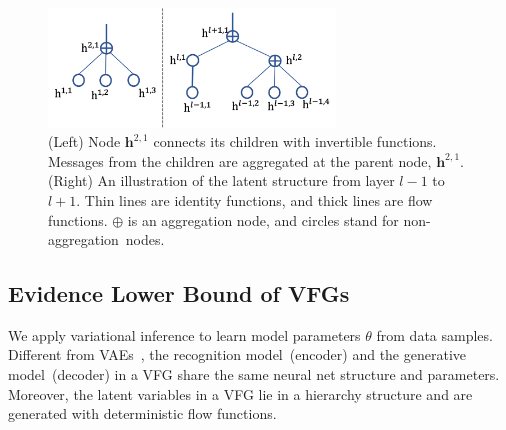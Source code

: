 \documentclass[sigconf, anonymous, review]{acmart}
\theoremstyle{plain}
\theoremstyle{definition}
\theoremstyle{remark}
\begin{document}
\begin{figure}[h]
\vspace{-0.2in}
\begin{center}
 \includegraphics[width=3in]{fig/tree_node.png}
\end{center}
\vspace{-0.15in}
\caption{\small  (Left)  Node $\mathbf{h}^{2, 1}$ connects its children with invertible functions. Messages from the children are aggregated at the parent node, $\mathbf{h}^{2,1}$. (Right) An illustration of the latent structure from layer $l-1$ to $l+1$.  Thin lines are identity functions, and thick lines are flow functions.   $\oplus$ is an aggregation node, and circles stand for non-aggregation~nodes.}
\label{fig:tree}
\vspace{-0.15in}
\end{figure}


\subsection{Evidence Lower Bound of VFGs}


We apply variational inference to learn model parameters  $\theta$ from data samples. Different from VAEs~\cite{kingma2013auto,rezende2014stochastic}, the recognition model~(encoder) and the generative model~(decoder) in a VFG share the same  neural net structure and parameters. Moreover, the latent variables in a VFG lie in a hierarchy structure and  are generated with deterministic flow functions.

\end{document}
